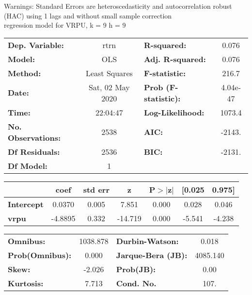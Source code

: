Warnings: \newline
 [1] Standard Errors are heteroscedasticity and autocorrelation robust (HAC) using 1 lags and without small sample correction\\ 

regression model for VRPU, k = 9 h = 9\begin{center}
\begin{tabular}{lclc}
\toprule
\textbf{Dep. Variable:}    &       rtrn       & \textbf{  R-squared:         } &     0.076   \\
\textbf{Model:}            &       OLS        & \textbf{  Adj. R-squared:    } &     0.076   \\
\textbf{Method:}           &  Least Squares   & \textbf{  F-statistic:       } &     216.7   \\
\textbf{Date:}             & Sat, 02 May 2020 & \textbf{  Prob (F-statistic):} &  4.04e-47   \\
\textbf{Time:}             &     22:04:47     & \textbf{  Log-Likelihood:    } &    1073.4   \\
\textbf{No. Observations:} &        2538      & \textbf{  AIC:               } &    -2143.   \\
\textbf{Df Residuals:}     &        2536      & \textbf{  BIC:               } &    -2131.   \\
\textbf{Df Model:}         &           1      & \textbf{                     } &             \\
\bottomrule
\end{tabular}
\begin{tabular}{lcccccc}
                   & \textbf{coef} & \textbf{std err} & \textbf{z} & \textbf{P$> |$z$|$} & \textbf{[0.025} & \textbf{0.975]}  \\
\midrule
\textbf{Intercept} &       0.0370  &        0.005     &     7.851  &         0.000        &        0.028    &        0.046     \\
\textbf{vrpu}      &      -4.8895  &        0.332     &   -14.719  &         0.000        &       -5.541    &       -4.238     \\
\bottomrule
\end{tabular}
\begin{tabular}{lclc}
\textbf{Omnibus:}       & 1038.878 & \textbf{  Durbin-Watson:     } &    0.018  \\
\textbf{Prob(Omnibus):} &   0.000  & \textbf{  Jarque-Bera (JB):  } & 4085.140  \\
\textbf{Skew:}          &  -2.026  & \textbf{  Prob(JB):          } &     0.00  \\
\textbf{Kurtosis:}      &   7.713  & \textbf{  Cond. No.          } &     107.  \\
\bottomrule
\end{tabular}
\end{center}

